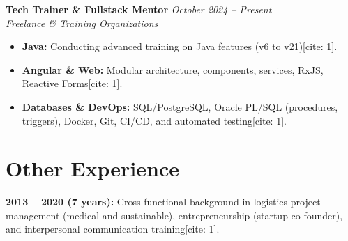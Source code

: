 \documentclass[a4paper,10pt]{article}
\newcommand{\cvtext}{\fontsize{9}{11}\selectfont}
\begin{document}
\begin{minipage}[t]{0.68\textwidth}
\begin{tcolorbox}[cvbox, width=\linewidth, fontupper=\cvtext]
    \textcolor{bleu}{\textbf{Tech Trainer \& Fullstack Mentor}} \hfill \textit{October 2024 -- Present}\\
    \textit{Freelance \& Training Organizations}
    \begin{itemize}[leftmargin=*]
      \item \textbf{Java:} Conducting advanced training on Java features (v6 to v21)[cite: 1].
      \item \textbf{Angular \& Web:} Modular architecture, components, services, RxJS, Reactive Forms[cite: 1].
      \item \textbf{Databases \& DevOps:} SQL/PostgreSQL, Oracle PL/SQL (procedures, triggers), Docker, Git, CI/CD, and automated testing[cite: 1].
    \end{itemize}
    \vspace{0.8em}
\end{tcolorbox}

\section*{Other Experience}
\begin{tcolorbox}[cvbox, width=\linewidth, fontupper=\cvtext]
  \textbf{2013 -- 2020 (7 years):} Cross-functional background in logistics project management (medical and sustainable), entrepreneurship (startup co-founder), and interpersonal communication training[cite: 1].
\end{tcolorbox}

\end{minipage}
\end{document}
